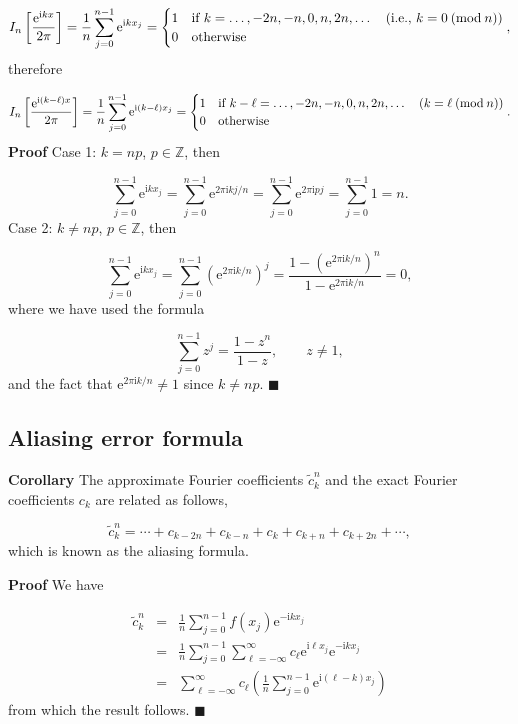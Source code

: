 \documentclass[12pt,landscape]{article}
\begin{document}
{\[
I_n\left[\frac{\mathrm{e}^{\mathrm{i}kx}}{2\pi}\right] = \frac{1}{n}\sum_{j = 0}^{n-1} \mathrm{e}^{\mathrm{i}kx_j} = \begin{cases}
1 & \text{if } k = \ldots, -2n, -n, 0, n, 2n, \ldots \quad (\text{i.e., }  k = 0\: ({\rm{mod }}\:n)) \\
0 & \text{otherwise}
\end{cases},
\]
therefore

\[
I_n\left[\frac{\mathrm{e}^{\mathrm{i}(k-\ell)x}}{2\pi}\right] = \frac{1}{n}\sum_{j = 0}^{n-1} \mathrm{e}^{\mathrm{i}(k-\ell)x_j} = \begin{cases}
1 & \text{if } k-\ell = \ldots, -2n, -n, 0, n, 2n, \ldots \quad  (k = \ell\: ({\rm{mod }}\:n)) \\
0 & \text{otherwise}
\end{cases}.
\]
\textbf{Proof} Case 1: $k = np$, $p \in \mathbb{Z}$, then

\[
\sum_{j = 0}^{n-1} \mathrm{e}^{\mathrm{i}kx_j} = \sum_{j = 0}^{n-1} \mathrm{e}^{2\pi\mathrm{i}kj/n} = \sum_{j = 0}^{n-1} \mathrm{e}^{2\pi\mathrm{i}pj} = \sum_{j = 0}^{n-1} 1 = n.
\]
\newpage
Case 2: $k \neq np$, $p \in \mathbb{Z}$, then

\[
\sum_{j = 0}^{n-1} \mathrm{e}^{\mathrm{i}kx_j} = \sum_{j = 0}^{n-1} \left(\mathrm{e}^{2\pi\mathrm{i}k/n}\right)^{j} = \frac{1-\left(\mathrm{e}^{2\pi\mathrm{i}k/n}\right)^{n}}{1-\mathrm{e}^{2\pi\mathrm{i}k/n}} = 0,
\]
where we have used the formula

\[
\sum_{j = 0}^{n-1} z^{j} = \frac{1-z^n}{1-z},\qquad z \neq 1,
\]
and the fact that $\mathrm{e}^{2\pi\mathrm{i}k/n} \neq 1$ since $k \neq np$.  $\blacksquare$

\subsection{Aliasing error formula}
\textbf{Corollary} The approximate Fourier coefficients $\tilde{c}^n_k$ and the exact Fourier coefficients $c_k$ are related as follows,

\[
\tilde{c}^n_k = \cdots + c_{k-2n} + c_{k-n} +  c_k +  c_{k+n} + c_{k+2n} + \cdots,
\]
which is known as the aliasing formula.

\textbf{Proof}  We have


\begin{eqnarray*}
  \tilde{c}^n_k   &=&\frac{1}{n}\sum_{j = 0}^{n-1} f(x_j)\mathrm{e}^{-\mathrm{i}kx_j}   \\
    & = & \frac{1}{n}\sum_{j = 0}^{n-1} \sum_{\ell=-\infty}^{\infty} c_{\ell}\mathrm{e}^{\mathrm{i}\ell x_j} \mathrm{e}^{-\mathrm{i}kx_j}  \\
    &=& \sum_{\ell=-\infty}^{\infty}c_{\ell}\left(\frac{1}{n}\sum_{j = 0}^{n-1} \mathrm{e}^{\mathrm{i}(\ell-k) x_j}   \right)
\end{eqnarray*}
from which the result follows.   $\blacksquare$

}
\end{document}
